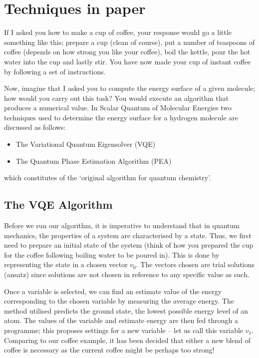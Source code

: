 \documentclass[12pt]{article}
\begin{document}
\section{Techniques in paper}
If I asked you how to make a cup of coffee, your response would go a little something like this; prepare a cup (clean of course), put a number of
 teaspoons of coffee (depends on how strong you like your coffee), boil the kettle, pour the hot water into the cup and lastly stir. You have now
 made your cup of instant coffee by following a set of instructions.

Now, imagine that I asked you to compute the energy surface of a given molecule; how would you carry out this task? You would execute an algorithm
 that produces a numerical value. In Scalar Quantum of Molecular Energies two techniques used to determine the energy surface for a hydrogen molecule
 are discussed as follows:
\begin{itemize}
\item The Variational Quantum Eigensolver (VQE)
\item The Quantum Phase Estimation Algorithm (PEA)
\end{itemize}
which constitutes of the ‘original algorithm for quantum chemistry’.

\subsection{The VQE Algorithm}

Before we run our algorithm, it is imperative to understand that in quantum mechanics, the properties of a system are characterised by a state.
Thus, we first need to prepare an initial state of the system (think of how you prepared the cup for the coffee following boiling water to be
poured in). This is done by representing the state in a chosen vector $v_0$. The vectors chosen are trial solutions (ansatz) since solutions are
 not chosen in reference to any specific value as such.

Once a variable is selected, we can find an estimate value of the energy corresponding to the chosen variable by measuring the average energy.
The method utilised predicts the ground state, the lowest possible energy level of an atom. The values of the variable and estimate energy are
then fed through a programme; this proposes settings for a new variable – let us call this variable $v_1$­. Comparing to our coffee example, it
 has been decided that either a new blend of coffee is necessary as the current coffee might be perhaps too strong!
\end{document}
